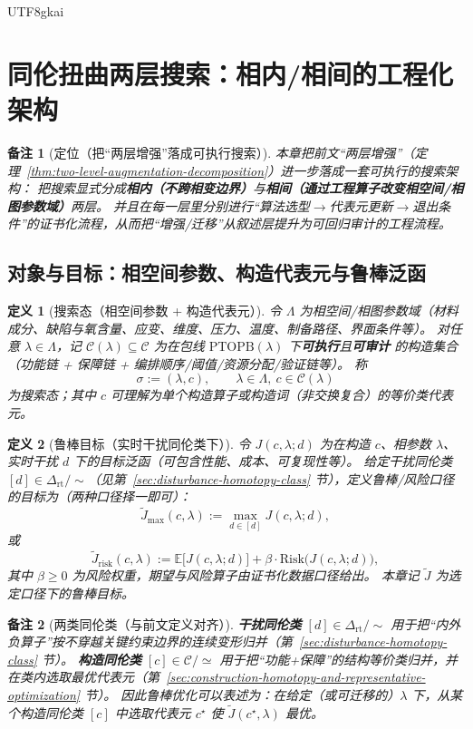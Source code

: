 \documentclass[12pt]{article}
\newtheorem{definition}{定义}[section]
\newtheorem{remark}{备注}[section]
\newcommand{\PTOPB}{\ensuremath{\mathrm{PTOPB}}}
\newcommand{\DeltaRT}{\ensuremath{\Delta_{\mathrm{rt}}}}
\begin{document}
\begin{CJK*}{UTF8}{gkai}
\section{同伦扭曲两层搜索：相内/相间的工程化架构}
\label{sec:twisted-homotopy-two-level-search}

\begin{remark}[定位（把“两层增强”落成可执行搜索）]
本章把前文“两层增强”（定理~\ref{thm:two-level-augmentation-decomposition}）进一步落成一套可执行的搜索架构：
把搜索显式分成\textbf{相内（不跨相变边界）}与\textbf{相间（通过工程算子改变相空间/相图参数域）}两层。
并且在每一层里分别进行“算法选型$\to$代表元更新$\to$退出条件”的证书化流程，从而把“增强/迁移”从叙述层提升为可回归审计的工程流程。
\end{remark}

\subsection{对象与目标：相空间参数、构造代表元与鲁棒泛函}
\label{sec:twisted-search-objects-and-objective}

\begin{definition}[搜索态（相空间参数 + 构造代表元）]
令 $\Lambda$ 为相空间/相图参数域（材料成分、缺陷与氧含量、应变、维度、压力、温度、制备路径、界面条件等）。
对任意 $\lambda\in\Lambda$，记 $\mathcal{C}(\lambda)\subseteq\mathcal{C}$ 为在包线 $\PTOPB(\lambda)$ 下\textbf{可执行}且\textbf{可审计}
  的构造集合（功能链 + 保障链 + 编排顺序/阈值/资源分配/验证链等）。
称
\[
  \sigma := (\lambda,c),\qquad \lambda\in\Lambda,\ c\in\mathcal{C}(\lambda)
\]
为搜索态；其中 $c$ 可理解为单个构造算子或构造词（非交换复合）的等价类代表元。
\end{definition}

\begin{definition}[鲁棒目标（实时干扰同伦类下）]
令 $J(c,\lambda;d)$ 为在构造 $c$、相参数 $\lambda$、实时干扰 $d$ 下的目标泛函（可包含性能、成本、可复现性等）。
给定干扰同伦类 $[d]\in\DeltaRT/\!\sim$（见第~\ref{sec:disturbance-homotopy-class} 节），定义鲁棒/风险口径的目标为（两种口径择一即可）：
\[
  \tilde J_{\max}(c,\lambda)
  := \max_{d\in[d]} J(c,\lambda;d),
\]
或
\[
  \tilde J_{\mathrm{risk}}(c,\lambda)
  := \mathbb{E}\bigl[J(c,\lambda;d)\bigr]+\beta\cdot \mathrm{Risk}\bigl(J(c,\lambda;d)\bigr),
\]
其中 $\beta\ge 0$ 为风险权重，期望与风险算子由证书化数据口径给出。
本章记 $\tilde J$ 为选定口径下的鲁棒目标。
\end{definition}

\begin{remark}[两类同伦类（与前文定义对齐）]
\textbf{干扰同伦类} $[d]\in\DeltaRT/\!\sim$ 用于把“内外负算子”按不穿越关键约束边界的连续变形归并（第~\ref{sec:disturbance-homotopy-class} 节）。
\textbf{构造同伦类} $[c]\in\mathcal{C}/\!\simeq$ 用于把“功能+保障”的结构等价类归并，并在类内选取最优代表元（第~\ref{sec:construction-homotopy-and-representative-optimization} 节）。
因此鲁棒优化可以表述为：在给定（或可迁移的）$\lambda$ 下，从某个构造同伦类 $[c]$ 中选取代表元 $c^\star$ 使 $\tilde J(c^\star,\lambda)$ 最优。
\end{remark}


\end{CJK*}
\end{document}
